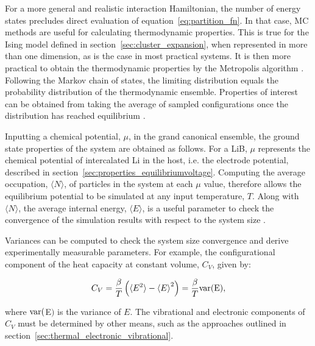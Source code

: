 \documentclass[../main.tex]{subfiles}
\begin{document}
For a more general and realistic interaction Hamiltonian, the number of energy states precludes direct evaluation of equation~\ref{eq:partition_fn}. In that case, MC methods are useful for calculating thermodynamic properties. This is true for the Ising model defined in section~\ref{sec:cluster_expansion}, when represented in more than one dimension, as is the case in most practical systems.  It is then more practical to obtain the thermodynamic properties by the Metropolis algorithm \cite{Metropolis1953}. Following the Markov chain of states, the limiting distribution equals the probability distribution of the thermodynamic ensemble. Properties of interest can be obtained from taking the average of sampled configurations once the distribution has reached equilibrium \cite{oviedo2015underpotential}.

Inputting a chemical potential, $\mu$, in the grand canonical ensemble, the ground state properties of the system are obtained as follows. For a LiB, $\mu$ represents the chemical potential of intercalated Li in the host, i.e. the electrode potential, described in section~\ref{sec:properties_equilibriumvoltage}. Computing the average occupation, $\langle N \rangle$, of particles in the system at each $\mu$ value, therefore allows the equilibrium potential to be simulated at any input temperature, $T$. Along with $\langle N \rangle$, the average internal energy, $\langle{E}\rangle$, is a useful parameter to check the convergence of the simulation results with respect to the system size \cite{mercer_influence_2017,Binder2009book,Kim2001h,darling1999}.

Variances can be computed to check the system size convergence and derive experimentally measurable parameters. For example, the configurational component of the heat capacity at constant volume, $C_{V}$, given by:

\begin{equation}
    C_{V} = \frac{\beta}{T}\left(\langle{E^{2}}\rangle -{\langle{E}\rangle}^{2}\right) =  \frac{\beta}{T}\rm{var}(E),
    \label{eq:mc_heat_cap}
\end{equation}

where $\rm{var}($E$)$ is the variance of $E$. The vibrational and electronic components of $C_{V}$ must be determined by other means, such as the approaches outlined in section~\ref{sec:thermal_electronic_vibrational}. 
\end{document}
